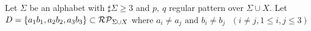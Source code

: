 \begin{lem}\label{lem:3consts_iii}
  Let $\Sigma$ be an alphabet with $\sharp\Sigma \ge 3$ and $p,~q$ regular pattern {\color{red}over} $\Sigma\cup X$.
  {\color{red}Let $D=\{ a_{1}b_{1}, a_{2}b_{2}, a_{3}b_{3}\}\subset \mathcal{RP}_{\Sigma\cup X}$ where $a_{i} \ne a_{j} \mbox{ and } b_{i} \ne b_{j} \mbox{ } (i\ne j, 1\le i,j\le 3)$}
\end{lem}

